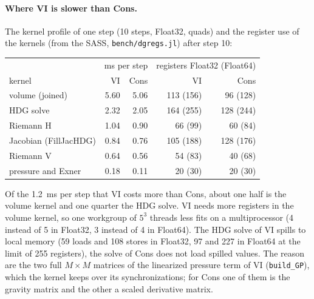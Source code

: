 \documentclass[11pt,a4paper]{article}
\newcommand{\code}[1]{\texttt{#1}}
\begin{document}
\paragraph{Where VI is slower than Cons.} The kernel profile of one step
(10 steps, Float32, quads) and the register use of the kernels (from the
SASS, \code{bench/dgregs.jl}) after step 10:
\begin{center}
\small
\begin{tabular}{lrrrr}
\toprule
 & \multicolumn{2}{c}{ms per step} & \multicolumn{2}{c}{registers Float32 (Float64)} \\
kernel & VI & Cons & VI & Cons \\
\midrule
volume (joined)      & 5.60 & 5.06 & 113 (156) & 96 (128) \\
HDG solve            & 2.32 & 2.05 & 164 (255) & 128 (244) \\
Riemann H            & 1.04 & 0.90 & 66 (99)   & 60 (84) \\
Jacobian (FillJacHDG)& 0.84 & 0.76 & 105 (188) & 128 (176) \\
Riemann V            & 0.64 & 0.56 & 54 (83)   & 40 (68) \\
pressure and Exner   & 0.18 & 0.11 & 20 (30)   & 20 (30) \\
\bottomrule
\end{tabular}
\end{center}
Of the 1.2~ms per step that VI costs more than Cons, about one half is the
volume kernel and one quarter the HDG solve. VI needs more registers in
the volume kernel, so one workgroup of $5^3$ threads less fits on a
multiprocessor (4 instead of 5 in Float32, 3 instead of 4 in Float64).
The HDG solve of VI spills to local memory (59 loads and 108 stores in
Float32, 97 and 227 in Float64 at the limit of 255 registers), the
solve of Cons does not load spilled values. The reason are the two full
$M\times M$ matrices of the linearized pressure term of VI
(\code{build\_GP}), which the kernel keeps over its synchronizations;
for Cons one of them is the gravity matrix and the other a scaled
derivative matrix.
\end{document}
